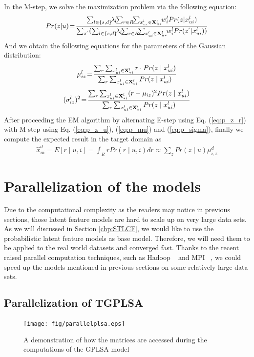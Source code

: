 In the M-step, we solve the maximization problem via the following equation:
\begin{eqnarray}\label{eq:p_z_u}
Pr(z|u)\!=\!\frac{\sum_{l \in \{s,d\}}\!\!\lambda_l\! \!\sum_{r \in R}\!\!\sum_{x_{ui}^l \in \X^l_{u*}}\!\!w^l_i Pr(z | x_{ui}^l)  }{\sum_{z^{'}} (\sum _{l \in \{s,d\}}\!\!\lambda_l\!\!\sum_{r \in R}\!\!\sum_{x_{ui}^l \in \X^l_{u*}}\!\! w^l_i Pr(z^{'} | x_{ui}^l) ) }
\end{eqnarray}
And we obtain the following equations for the parameters of the Gaussian distribution:
\begin{eqnarray}\label{eq:p_mu}
\mu_{iz}^l \!=\! \frac{\sum_r\sum_{x_{ui}^l \in \mathbf{X}^l_{*i}} r \cdot Pr(z \mid x_{ui}^l)}{\sum_r\sum_{x_{ui}^l \in \mathbf{X}^l_{*i}} Pr(z \mid x_{ui}^l)}
\end{eqnarray}
\begin{eqnarray}\label{eq:p_sigma}
(\sigma_{iz}^{l})^2 \!=\! \frac{\sum_r\sum_{x_{ui}^l \in \mathbf{X}^l_{*i}} (r-\mu_{iz})^2 Pr(z \mid x_{ui}^l)}{\sum_r\sum_{x_{ui}^l \in \mathbf{X}^l_{*i}} Pr(z \mid x_{ui}^l)}
\end{eqnarray}
After proceeding the EM algorithm by alternating E-step using Eq. (\ref{eq:p_z_r}) with M-step using Eq. (\ref{eq:p_z_u}), (\ref{eq:p_mu}) and (\ref{eq:p_sigma}), finally we compute the expected result in the target domain as
\begin{eqnarray}\label{eq:pred}
\hat x_{ui}^d\!=\!E[r \mid u,i] \!=\! \int_R r Pr(r \mid u, i) dr \!\approx\! \sum_{z} Pr(z \mid u) \mu_{i,z}^d
\end{eqnarray}

\hspace{0.1in}
\section{Parallelization of the models}
Due to the computational complexity as the readers may notice in previous sections, those latent feature models are hard to scale up on very large data sets. As we will discussed in Section \ref{chp:STLCF}, we would like to use the probabilistic latent feature models as base model. Therefore, we will need them to be applied to the real world datasets and converged fast. Thanks to the recent raised parallel computation techniques, such as Hadoop ~\cite{white2012hadoop} and MPI ~\cite{gropp1999using}, we could speed up the models mentioned in previous sections on some relatively large data sets.

\hspace{0.05in}
\subsection{Parallelization of TGPLSA}
\begin{figure}
\centering
\texttt{[image: fig/parallelplsa.eps]}
\caption{A demonstration of how the matrices are accessed during the computations of the GPLSA model}
\label{fig:parallelplsa}
\end{figure}

